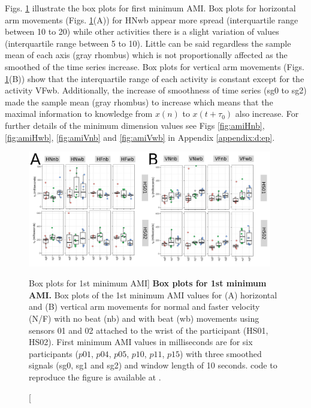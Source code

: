 Figs. \ref{fig:AMI-hii} illustrate the box plots for first minimum AMI.
Box plots for horizontal arm movements (Figs. \ref{fig:AMI-hii}(A)) for 
HNwb appear more spread (interquartile range between 10 to 20) while 
other activities there is a slight variation of values 
(interquartile range between 5 to 10).
Little can be said regardless the sample mean of each axis (gray rhombus) 
which is not proportionally affected as the smoothed of the time series 
increase.
Box plots for vertical arm movements (Figs. \ref{fig:AMI-hii}(B)) 
show that the interquartile range of each activity is constant
except for the activity VFwb.
Additionally, the increase of smoothness of time series (sg0 to sg2) made 
the sample mean (gray rhombus) to increase which means that 
the maximal information to knowledge from $x(n)$ to $x(t+\tau_0)$ also 
increase.
For further details of the minimum dimension values see 
Figs \ref{fig:amiHnb}, \ref{fig:amiHwb}, \ref{fig:amiVnb} and \ref{fig:amiVwb}
in Appendix \ref{appendix:d:ep}.
\begin{figure}
\centering
\includegraphics[width=0.95\textwidth]{fig_5_04}
	\caption
	[Box plots for 1st minimum AMI]{
	{\bf Box plots for 1st minimum AMI.} 
		Box plots of the 1st minimum AMI values for 
		(A) horizontal and (B) vertical arm movements for
		normal and faster velocity (N/F) with no beat (nb) 
		and with beat (wb) movements
		using sensors 01 and 02 attached to the wrist of the 
		participant (HS01, HS02).
		First minimum AMI values in milliseconds are 
		for six participants 
		($p01$, $p04$, $p05$, $p10$, $p11$, $p15$) with three 
		smoothed signals (sg0, sg1 and sg2)
		and window length of 10 seconds.
	\R code to reproduce the figure is available at 
	.
        }
    \label{fig:AMI-hii}
\end{figure}

